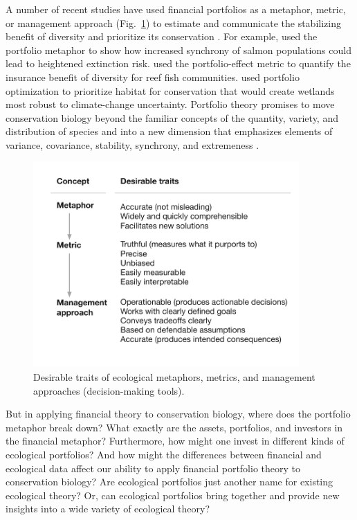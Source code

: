 A number of recent studies have used financial portfolios as a metaphor, metric, or management approach (Fig.~\ref{fig:traits}) to estimate and communicate the stabilizing benefit of diversity and prioritize its conservation \citep[e.g.][]{schindler2010, ando2011, halpern2011, hoekstra2012, anderson2013, mellin2014}. For example, \citet{moore2010} used the portfolio metaphor to show how increased synchrony of salmon populations could lead to heightened extinction risk. \citet{thibaut2012} used the portfolio-effect metric to quantify the insurance benefit of diversity for reef fish communities. \citet{ando2012} used portfolio optimization to prioritize habitat for conservation that would create wetlands most robust to climate-change uncertainty. Portfolio theory promises to move conservation biology beyond the familiar concepts of the quantity, variety, and distribution of species \citep{mace2005} and into a new dimension that emphasizes elements of variance, covariance, stability, synchrony, and extremeness \citep{loreau2010a, thompson2013}.

\begin{figure}[htbp]
\centering
\includegraphics[width=4in]{mmm-traits.pdf}
\caption{Desirable traits of ecological metaphors, metrics, and management approaches
(decision-making tools).}
\label{fig:traits}
\end{figure}

But in applying financial theory to conservation biology, where does the portfolio metaphor break down? What exactly are the assets, portfolios, and investors in the financial metaphor? Furthermore, how might one invest in different kinds of ecological portfolios? And how might the differences between financial and ecological data affect our ability to apply financial portfolio theory to conservation biology? Are ecological portfolios just another name for existing ecological theory? Or, can ecological portfolios bring together and provide new insights into a wide variety of ecological theory?

